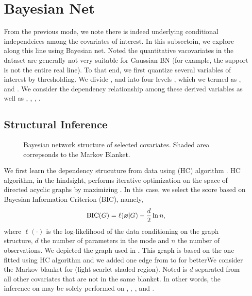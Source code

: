 \section{Bayesian Net} \label{sub:bn}

	From the previous mode, we note there is indeed underlying conditional
	independeices among the covariates of interest. In this subsectoin,
	we explore along this line using Bayesian net. Noted the quantitative vacovariates in the dataset
	are generally not very suitable for Gaussian BN (for example, the support is not the entire real line).
	To that end, we first quantize several variables of interest by thresholding. We divide , 
	and  into four levels , which we termed as ,
	 and . We consider the dependency
	relationship among these derived variables as well as , , ,
	.

	\subsection{Structural Inference}

		\begin{figure}[htpb]
			\centering
			\def\svgwidth{0.8\textwidth}
			
			\caption{Bayesian network structure of selected covariates. Shaded area correpsonds to the Markov Blanket.}
			\label{fig:bn}
		\end{figure}

		We first learn the dependency strucuture from data using  (HC) algorithm \cite{Tsa:2006:HC}.
		HC algorithm, in the hindsight, performs iterative optimization on the space of directed acyclic graphs
		by maximizing . In this case, we select the score
		based on Bayesian Information Criterion (BIC), namely,
		\begin{equation} \label{eq:bn_bic}
		\begin{aligned}
			\mathrm{BIC}(G) = \ell({\boldsymbol x} \vert G) - \frac{d}{2} \ln n,
		\end{aligned}
		\end{equation}
		where $\ell(\cdot)$ is the log-likelihood of the data conditioning on the graph
		structure, $d$ the number of parameters in the mode and $n$ the number of observations.
		We depicted the graph used in . This graph is based on the one
		fitted using HC algorithm and we added one edge from  to  for betterWe consider the Markov blanket
		for  (light scarlet shaded region). Noted  is $d$-separated
		from all other covariates that are not in the same blanket. In other words, the inference
		on  may be solely performed on , , ,
		 and .

